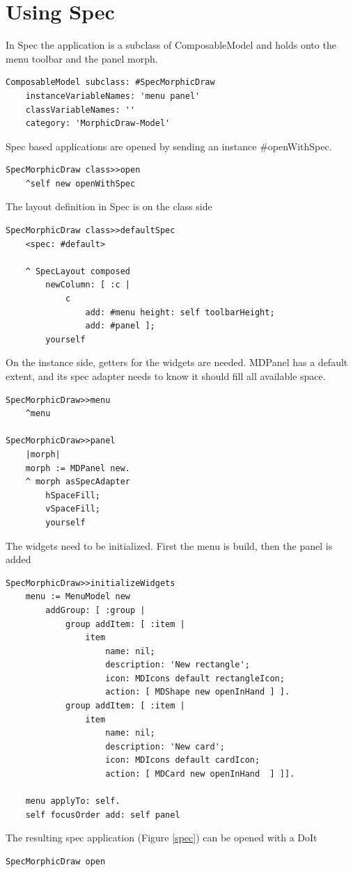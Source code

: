 \documentclass[10pt]{article}   	%
\begin{document}
\section{Using Spec}
In Spec the application is a subclass of ComposableModel and holds onto the menu toolbar
and the panel morph.
\begin{verbatim}
ComposableModel subclass: #SpecMorphicDraw
    instanceVariableNames: 'menu panel'
    classVariableNames: ''
    category: 'MorphicDraw-Model'
\end{verbatim}
Spec based applications are opened by sending an instance \#openWithSpec.
\begin{verbatim}
SpecMorphicDraw class>>open
	^self new openWithSpec
\end{verbatim}
The layout definition in Spec is on the class side
\begin{verbatim}
SpecMorphicDraw class>>defaultSpec
    <spec: #default>
	
    ^ SpecLayout composed
        newColumn: [ :c | 
            c 
                add: #menu height: self toolbarHeight;
                add: #panel ];
        yourself
\end{verbatim}
On the instance side, getters for the widgets are needed. MDPanel has a default extent,
and its spec adapter needs to know it should fill all available space.
\begin{verbatim}
SpecMorphicDraw>>menu
    ^menu
	
SpecMorphicDraw>>panel
    |morph|
    morph := MDPanel new.
    ^ morph asSpecAdapter
        hSpaceFill;
        vSpaceFill;
        yourself
\end{verbatim}
The widgets need to be initialized. First the menu is build, then the panel is added
\begin{verbatim}
SpecMorphicDraw>>initializeWidgets
    menu := MenuModel new
        addGroup: [ :group |
            group addItem: [ :item |
                item
                    name: nil;
                    description: 'New rectangle';
                    icon: MDIcons default rectangleIcon;
                    action: [ MDShape new openInHand ] ].
            group addItem: [ :item |
                item 
                    name: nil;
                    description: 'New card';
                    icon: MDIcons default cardIcon;
                    action: [ MDCard new openInHand  ] ]].
		
    menu applyTo: self.
    self focusOrder add: self panel
\end{verbatim} 
The resulting spec application (Figure \ref{spec}) can be opened with a DoIt
\begin{verbatim}
SpecMorphicDraw open
\end{verbatim}
\end{document}
